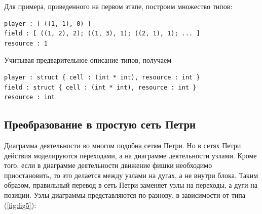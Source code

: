 Для примера, приведенного на первом этапе, построим множество типов:

\begin{lstlisting}[style=grammar,basicstyle=\small]
player : [ ((1, 1), 0) ]
field : [ ((1, 2), 2); ((1, 3), 1); ((2, 1), 1); ... ]
resource : 1
\end{lstlisting}

Учитывая предварительное описание типов, получаем

\begin{lstlisting}[style=grammar,basicstyle=\small]
player : struct { cell : (int * int), resource : int }
field : struct { cell : (int * int), resource : int }
resource : int
\end{lstlisting}

\subsection{Преобразование в простую сеть Петри}

Диаграмма деятельности во многом подобна сетям Петри. Но в сетях Петри действия моделируются переходами, а на диаграмме деятельности узлами. Кроме того, если в диаграмме деятельности движение фишки необходимо приостановить, то это делается между узлами на дугах, а не внутри блока. Таким образом, правильный перевод в сеть Петри заменяет узлы на переходы, а дуги на позиции. Узлы диаграммы представляются по-разнову, в зависимости от типа (\ref{fig:fig5}):


